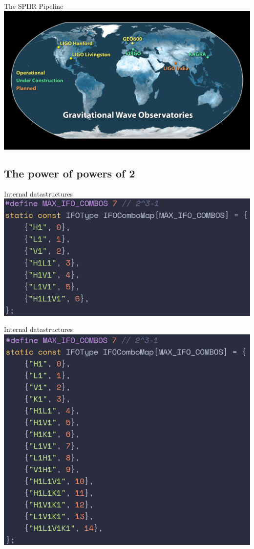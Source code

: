 \documentclass{beamer}
\begin{document}
\begin{frame}{The SPIIR Pipeline}
    \centering
    \includegraphics[width=\textwidth]{ligoNetwork-lg.jpg}
\end{frame}

\subsection{The power of powers of 2}

\begin{frame}{Internal datastructures}
    \centering
    \includegraphics[width=\textwidth]{old-icombo.png}
\end{frame}

\begin{frame}{Internal datastructures}
    \centering
    \includegraphics[height=0.75\textheight]{old-icombo-add.png}
\end{frame}
\end{document}

